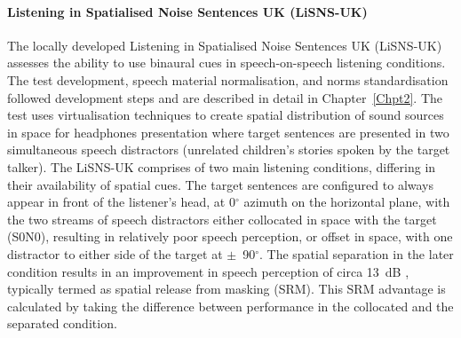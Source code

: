 \documentclass[a4paper, twoside]{templates/ociamthesis}
\begin{document}
\hypertarget{listening-in-spatialised-noise-sentences-uk-lisns-uk}{%
\paragraph{Listening in Spatialised Noise Sentences UK (LiSNS-UK)}\label{listening-in-spatialised-noise-sentences-uk-lisns-uk}}

\hfill\break
The locally developed Listening in Spatialised Noise Sentences UK (LiSNS-UK) assesses the ability to use binaural cues in speech-on-speech listening conditions. The test development, speech material normalisation, and norms standardisation followed \textcite{Cameron2007} development steps and are described in detail in Chapter~\ref{Chpt2}. The test uses virtualisation techniques to create spatial distribution of sound sources in space for headphones presentation where target sentences \autocite[ASL;][]{MacLeod1990} are presented in two simultaneous speech distractors (unrelated children's stories spoken by the target talker). The LiSNS-UK comprises of two main listening conditions, differing in their availability of spatial cues. The target sentences are configured to always appear in front of the listener's head, at 0\(^{\circ}\) azimuth on the horizontal plane, with the two streams of speech distractors either collocated in space with the target (S0N0), resulting in relatively poor speech perception, or offset in space, with one distractor to either side of the target at \(\pm\)~90\(^{\circ}\). The spatial separation in the later condition results in an improvement in speech perception of circa 13~dB \autocite{Cameron2011}, typically termed as spatial release from masking (SRM). This SRM advantage is calculated by taking the difference between performance in the collocated and the separated condition.\\
\end{document}
